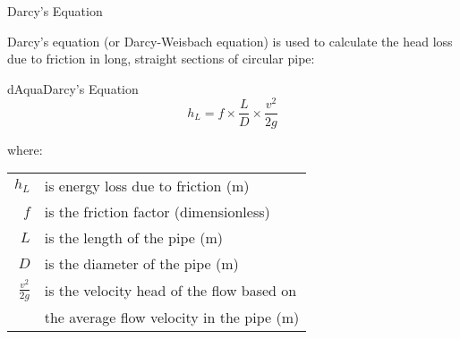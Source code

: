 \documentclass[9pt,xcolor=x11names,professionalfonts, mathserif]{beamer}
\begin{document}
\begin{frame}
\end{frame}

\begin{frame}{Darcy's Equation}
	\begin{cmini}[0.8]{
	Darcy's equation (or Darcy-Weisbach equation) is used to calculate the head loss due to friction in long, straight
	sections of circular pipe:
	}\end{cmini}
 	\vspace{-0.5cm}
	\begin{cmini}[0.5]{
		\par\medskip
		\begin{cb}[15]{dAqua}{Darcy's Equation}{%
			\[  h_L=f\times \frac{L}{D}\times \frac{v^2}{2g} \]
		}\end{cb}
		\vspace{-0.5cm}
		where:
		\par\bigskip
		\begin{tabular}{rl}
			$h_L$ & is energy loss due to friction (m)\\
			\addlinespace
			$f$ & is the friction factor (dimensionless)\\
			\addlinespace
			$L$ & is the length of the pipe (m)\\
			\addlinespace
			$D$ & is the diameter of the pipe (m)\\
			\addlinespace
			$\tfrac{v^2}{2g}$ & is the velocity head of the flow based on \\&
			the average flow velocity in the pipe (m)\\
		\end{tabular}
	}\end{cmini}

\end{frame}
\end{document}
